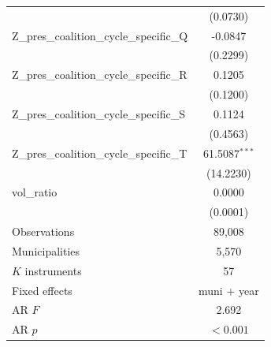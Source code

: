 \begin{tabular}{lc}
 & (0.0730) \\
Z\_pres\_coalition\_cycle\_specific\_Q & -0.0847 \\
 & (0.2299) \\
Z\_pres\_coalition\_cycle\_specific\_R & 0.1205 \\
 & (0.1200) \\
Z\_pres\_coalition\_cycle\_specific\_S & 0.1124 \\
 & (0.4563) \\
Z\_pres\_coalition\_cycle\_specific\_T & 61.5087$^{***}$ \\
 & (14.2230) \\
vol\_ratio & 0.0000 \\
 & (0.0001) \\
\midrule
Observations & 89,008 \\
Municipalities & 5,570 \\
$K$ instruments & 57 \\
Fixed effects & muni + year \\
AR $F$ & 2.692 \\
AR $p$ & $<0.001$ \\
\bottomrule
\end{tabular}
